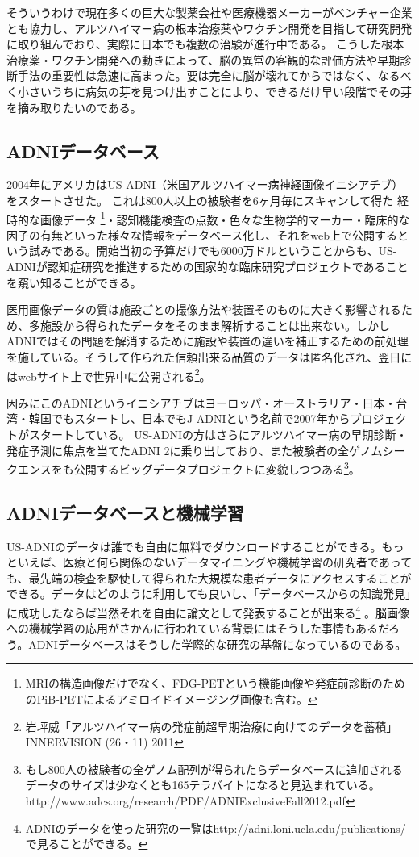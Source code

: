 そういうわけで現在多くの巨大な製薬会社や医療機器メーカーがベンチャー企業とも協力し、アルツハイマー病の根本治療薬やワクチン開発を目指して研究開発に取り組んでおり、実際に日本でも複数の治験が進行中である。
こうした根本治療薬・ワクチン開発への動きによって、脳の異常の客観的な評価方法や早期診断手法の重要性は急速に高まった。要は完全に脳が壊れてからではなく、なるべく小さいうちに病気の芽を見つけ出すことにより、できるだけ早い段階でその芽を摘み取りたいのである。
\subsection{ADNIデータベース}
2004年にアメリカはUS-ADNI（米国アルツハイマー病神経画像イニシアチブ）をスタートさせた。
これは800人以上の被験者を6ヶ月毎にスキャンして得た
経時的な画像データ
\footnote{
MRIの構造画像だけでなく、FDG-PETという機能画像や発症前診断のためのPiB-PETによるアミロイドイメージング画像も含む。}・認知機能検査の点数・色々な生物学的マーカー・臨床的な因子の有無といった様々な情報をデータベース化し、それをweb上で公開するという試みである。開始当初の予算だけでも6000万ドルということからも、US-ADNIが認知症研究を推進するための国家的な臨床研究プロジェクトであることを窺い知ることができる。

医用画像データの質は施設ごとの撮像方法や装置そのものに大きく影響されるため、多施設から得られたデータをそのまま解析することは出来ない。しかしADNIではその問題を解消するために施設や装置の違いを補正するための前処理を施している。そうして作られた信頼出来る品質のデータは匿名化され、翌日にはwebサイト上で世界中に公開される\footnote{岩坪威「アルツハイマー病の発症前超早期治療に向けてのデータを蓄積」INNERVISION (26・11) 2011}。

因みにこのADNIというイニシアチブはヨーロッパ・オーストラリア・日本・台湾・韓国でもスタートし、日本でもJ-ADNIという名前で2007年からプロジェクトがスタートしている。
US-ADNIの方はさらにアルツハイマー病の早期診断・発症予測に焦点を当てたADNI 2に乗り出しており、また被験者の全ゲノムシークエンスをも公開するビッグデータプロジェクトに変貌しつつある\footnote{もし800人の被験者の全ゲノム配列が得られたらデータベースに追加されるデータのサイズは少なくとも165テラバイトになると見込まれている。http://www.adcs.org/research/PDF/ADNIExclusiveFall2012.pdf}。

\subsection{ADNIデータベースと機械学習}
US-ADNIのデータは誰でも自由に無料でダウンロードすることができる。もっといえば、医療と何ら関係のないデータマイニングや機械学習の研究者であっても、最先端の検査を駆使して得られた大規模な患者データにアクセスすることができる。データはどのように利用しても良いし、「データベースからの知識発見」に成功したならば当然それを自由に論文として発表することが出来る\footnote{ADNIのデータを使った研究の一覧はhttp://adni.loni.ucla.edu/publications/で見ることができる。}
。脳画像への機械学習の応用がさかんに行われている背景にはそうした事情もあるだろう。ADNIデータベースはそうした学際的な研究の基盤になっているのである。


